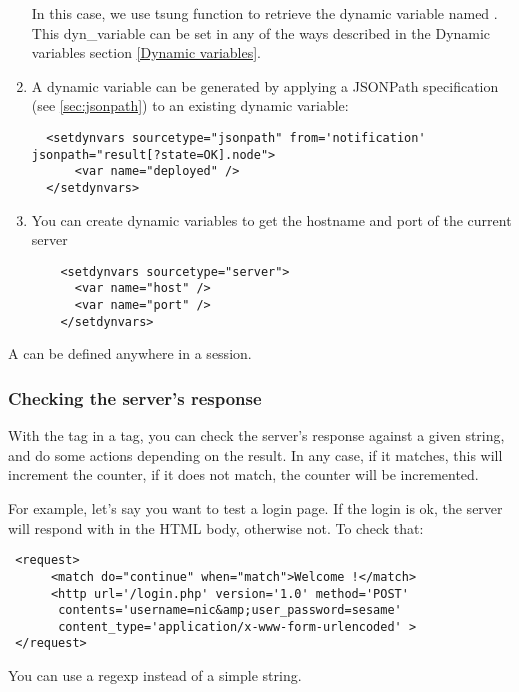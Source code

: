 \documentclass{TSUNG-en}
\begin{document}
\begin{enumerate}
In this case, we use tsung function  to retrieve the
dynamic variable named . This dyn\_variable 
can be set in any of the ways described in the Dynamic variables
section \ref{Dynamic variables}.
\item A dynamic variable can be generated by applying a JSONPath
  specification (see \ref{sec:jsonpath}) to an existing dynamic
  variable:
\begin{Verbatim}
  <setdynvars sourcetype="jsonpath" from='notification' jsonpath="result[?state=OK].node">
      <var name="deployed" />
  </setdynvars>
\end{Verbatim}
\item You can create dynamic variables to get the hostname and port of
  the current server
\begin{Verbatim}
    <setdynvars sourcetype="server">
      <var name="host" />
      <var name="port" />
    </setdynvars>
\end{Verbatim}

\end{enumerate}

A  can be defined anywhere in a session.



\subsubsection{Checking the server's response}


With the tag  in a  tag, you can check
the server's response against a given string, and do some actions
depending on the result. In any case, if it matches, this will
increment the  counter, if it does not match, the
 counter will be incremented.

For example, let's say you want to test a login page. If the login is
ok, the server will respond with  in the
HTML body, otherwise not. To check that:
\begin{Verbatim}
 <request>
      <match do="continue" when="match">Welcome !</match>
      <http url='/login.php' version='1.0' method='POST'
       contents='username=nic&amp;user_password=sesame'
       content_type='application/x-www-form-urlencoded' >
 </request>
\end{Verbatim}

You can use a regexp instead of a simple string.
\end{document}
